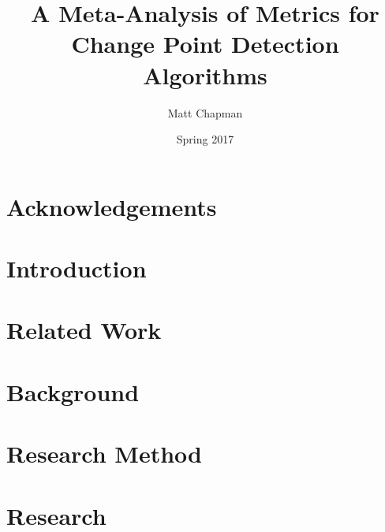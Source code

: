 \documentclass{uvamscse}	%
\title{A Meta-Analysis of Metrics for Change Point Detection Algorithms}
\date{Spring 2017}
\author{Matt Chapman}
\begin{document}
\maketitle


\chapter*{Acknowledgements}




\chapter{Introduction}




\chapter{Related Work}




\chapter{Background}
\label{background}




\chapter{Research Method}
\label{Research Method}




\chapter{Research}
\end{document}
